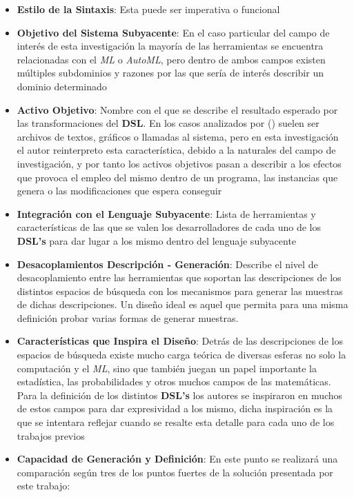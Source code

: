\begin{itemize}
    \item {\bf Estilo de la Sintaxis}: Esta puede ser imperativa o funcional
    \item {\bf Objetivo del Sistema Subyacente}: En el caso particular del campo de interés de esta
          investigación la mayoría de las herramientas se encuentra relacionadas con el {\it ML} o
              {\it AutoML}, pero dentro de ambos campos existen múltiples subdominios y razones por las que
          sería de interés describir un dominio determinado
    \item {\bf Activo Objetivo}: Nombre con el que se describe el resultado esperado por las transformaciones
          del {\bf DSL}. En los casos analizados por (\cite{langlois2007dsl}) suelen ser archivos de textos, gráficos o llamadas
          al sistema, pero en esta investigación el autor reinterpreto esta característica, debido a la
          naturales del campo de investigación, y por tanto los activos objetivos pasan a describir a
          los efectos que provoca el empleo del mismo dentro de un programa, las instancias que
          genera o las modificaciones que espera conseguir
    \item {\bf Integración con el Lenguaje Subyacente}: Lista de herramientas y características de las
          que se valen los desarrolladores de cada uno de los {\bf DSL's} para dar lugar a los mismo dentro
          del lenguaje subyacente
    \item {\bf Desacoplamientos Descripción - Generación}: Describe el nivel de desacoplamiento entre
          las herramientas que soportan las descripciones de los distintos espacios de búsqueda con
          los mecanismos para generar las muestras de dichas descripciones. Un diseño ideal
          es aquel que permita para una misma definición probar varias formas de generar muestras.
    \item {\bf Características que Inspira el Diseño}: Detrás de las descripciones de los espacios de
          búsqueda existe mucho carga teórica de diversas esferas no solo la computación y el {\it ML},
          sino que también juegan un papel importante la estadística, las probabilidades y otros muchos
          campos de las matemáticas. Para la definición de los distintos {\bf DSL's} los autores se inspiraron
          en muchos de estos campos para dar expresividad a los mismo, dicha inspiración es la que se
          intentara reflejar cuando se resalte esta detalle para cada uno de los trabajos previos
    \item {\bf Capacidad de Generación y Definición}: En este punto se realizará una comparación según tres
          de los puntos fuertes de la solución presentada por este trabajo:
          \begin{itemize}


\end{itemize}
\end{itemize}
